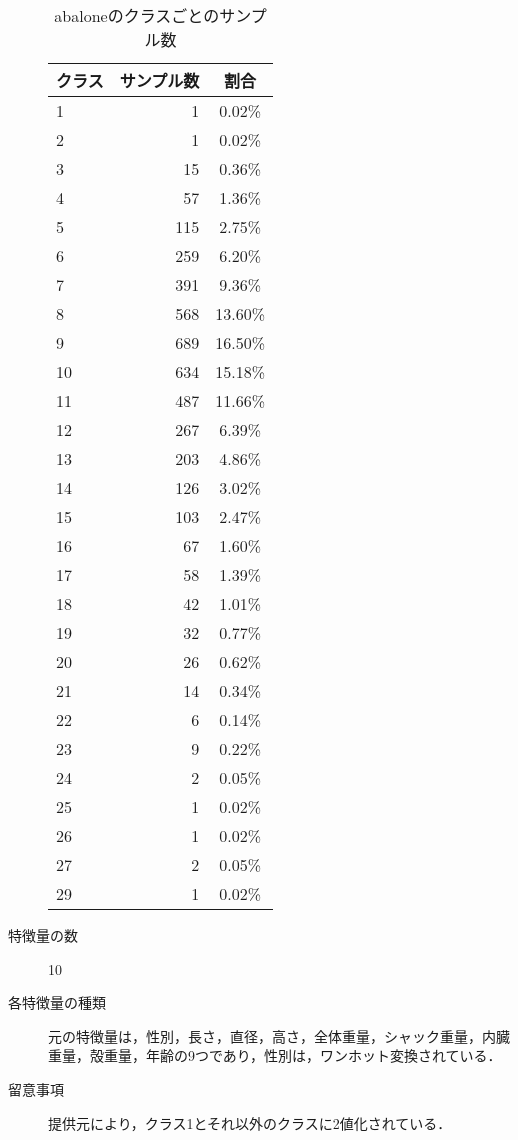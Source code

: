 \begin{description}
    \begin{table}[htbp]
        \centering
        \caption{abaloneのクラスごとのサンプル数}
        \label{tab:abalone}
        \begin{tabular}{lrc} \hline
            \multicolumn{1}{c}{クラス} &
            \multicolumn{1}{c}{サンプル数} &
            \multicolumn{1}{c}{割合} \\
            \hline
            \hline
            1 & 1 & 0.02\% \\
            2 & 1 & 0.02\% \\
            3 & 15 & 0.36\% \\
            4 & 57 & 1.36\% \\
            5 & 115 & 2.75\% \\
            6 & 259 & 6.20\% \\
            7 & 391 & 9.36\% \\
            8 & 568 & 13.60\% \\
            9 & 689 & 16.50\% \\
            10 & 634 & 15.18\% \\
            11 & 487 & 11.66\% \\
            12 & 267 & 6.39\% \\
            13 & 203 & 4.86\% \\
            14 & 126 & 3.02\% \\
            15 & 103 & 2.47\% \\
            16 & 67 & 1.60\% \\
            17 & 58 & 1.39\% \\
            18 & 42 & 1.01\% \\
            19 & 32 & 0.77\% \\
            20 & 26 & 0.62\% \\
            21 & 14 & 0.34\% \\
            22 & 6 & 0.14\% \\
            23 & 9 & 0.22\% \\
            24 & 2 & 0.05\% \\
            25 & 1 & 0.02\% \\
            26 & 1 & 0.02\% \\
            27 & 2 & 0.05\% \\
            29 & 1 & 0.02\% \\
            \hline
        \end{tabular}
    \end{table}

    \item[特徴量の数] 10
    \item[各特徴量の種類] \mbox{}
        元の特徴量は，性別，長さ，直径，高さ，全体重量，シャック重量，内臓重量，殻重量，年齢の9つであり，性別は，ワンホット変換されている．
    \item[留意事項] 提供元により，クラス1とそれ以外のクラスに2値化されている．
\end{description}


